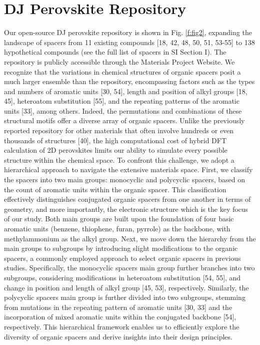\section{DJ Perovskite Repository}

Our open-source DJ perovskite repository is shown in Fig. \ref{f:fig2}, expanding the landscape of spacers from 11 existing compounds [18, 42, 48, 50, 51, 53-55] to 138 hypothetical compounds (see the full list of spacers in SI Section I). The repository is publicly accessible through the Materials Project Website. We recognize that the variations in chemical structures of organic spacers posit a much larger ensemble than the repository, encompassing factors such as the types and numbers of aromatic units [30, 54], length and position of alkyl groups [18, 45], heteroatom substitution [55], and the repeating patterns of the aromatic units [33], among others. Indeed, the permutations and combinations of these structural motifs offer a diverse array of organic spacers. Unlike the previously reported repository for other materials that often involve hundreds or even thousands of structures [40], the high computational cost of hybrid DFT calculation of 2D perovskites limits our ability to simulate every possible structure within the chemical space. To confront this challenge, we adopt a hierarchical approach to navigate the extensive materials space. First, we classify the spacers into two main groups: monocyclic and polycyclic spacers, based on the count of aromatic units within the organic spacer. This classification effectively distinguishes conjugated organic spacers from one another in terms of geometry, and more importantly, the electronic structure which is the key focus of our study. Both main groups are built upon the foundation of four basic aromatic units (benzene, thiophene, furan, pyrrole) as the backbone, with methylammonium as the alkyl group. Next, we move down the hierarchy from the main groups to subgroups by introducing slight modifications to the organic spacers, a commonly employed approach to select organic spacers in previous studies. Specifically, the monocyclic spacers main group further branches into two subgroups, considering modifications in heteroatom substitution [54, 55], and change in position and length of alkyl group [45, 53], respectively. Similarly, the polycyclic spacers main group is further divided into two subgroups, stemming from mutations in the repeating pattern of aromatic units [30, 33] and the incorporation of mixed aromatic units within the conjugated backbone [54], respectively. This hierarchical framework enables us to efficiently explore the diversity of organic spacers and derive insights into their design principles. 

